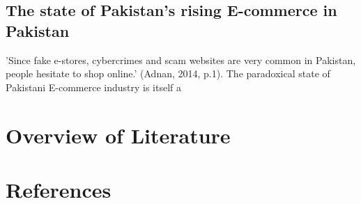 \subsection{The state of Pakistan's rising E-commerce in Pakistan}

'Since fake e-stores, cybercrimes and scam websites are very common in Pakistan, people hesitate to shop online.' (Adnan,  2014, p.1). The paradoxical state of Pakistani E-commerce industry is itself a 

\section{Overview of Literature}

\section{References}

